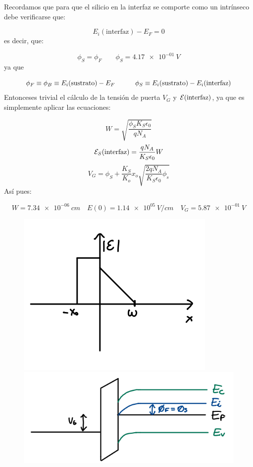 Recordamos que para que el silicio en la interfaz se comporte como un intrínseco debe verificarse que:

\begin{equation*}
	E_i(\text{interfaz}) - E_F = 0
\end{equation*}
es decir, que:

\begin{equation*}
	\phi_S = \phi_F \qquad
	\phi_{S} = \SI{4.17e-01}{V}
\end{equation*}
ya que

\begin{equation*}
	\phi_F \equiv \phi_B \equiv E_i(\text{sustrato}) - E_F \quad \quad \quad
	\phi_S \equiv E_i(\text{sustrato}) - E_i (\text{interfaz})
\end{equation*}
Entonceses trivial el cálculo de la tensión de puerta $V_G$ y $\mathcal{E}(\text{interfaz})$, ya que es simplemente aplicar las ecuaciones:

\begin{equation*}
	W = \sqrt{\frac{\phi_S K_S \epsilon_0}{qN_A}}
\end{equation*}
\begin{equation*}
	\mathcal{E}_S (\text{interfaz}) = \frac{qN_A}{K_S \epsilon_0}W
\end{equation*}
\begin{equation*}
	V_G = \phi_S + \frac{K_S}{K_o} x_o \sqrt{\frac{2qN_A}{K_S\epsilon_0} \phi_s}
\end{equation*}
Así pues:

\begin{equation*}
	W = \SI{7.34e-06}{cm} \quad
	E(0) = \SI{1.14e+05}{V/cm} \quad 
	V_G = \SI{5.87e-01}{V}
\end{equation*}
\begin{figure}[H] \centering
	\includegraphics[width=0.45\linewidth]{Ejercicios/Ch_05/Ej_04_a.png} \hfill
	\includegraphics[width=0.45\linewidth]{Ejercicios/Ch_05/Ej_04_b.png}
\end{figure}

